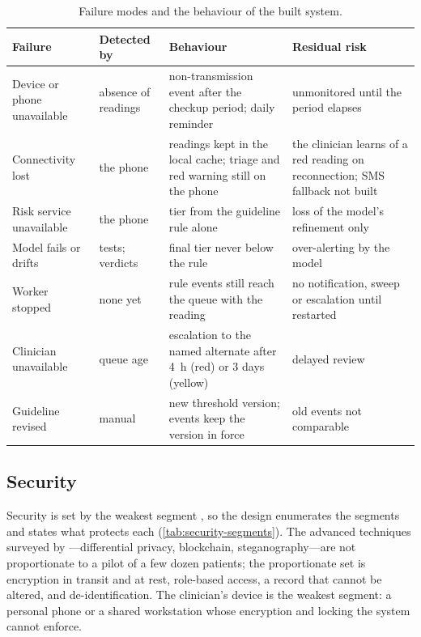 \documentclass[11pt,a4paper,oneside]{report}
\begin{document}
\begin{table}[htbp]
\centering\footnotesize
\caption{Failure modes and the behaviour of the built system.}\label{tab:failure-modes}
\begin{tabularx}{\textwidth}{@{}>{\raggedright\arraybackslash}p{2.8cm} >{\raggedright\arraybackslash}p{2.2cm} X >{\raggedright\arraybackslash}p{3.2cm}@{}}
\toprule
\textbf{Failure} & \textbf{Detected by} & \textbf{Behaviour} & \textbf{Residual risk} \\
\midrule
Device or phone unavailable & absence of readings & non-transmission event after the checkup period; daily reminder & unmonitored until the period elapses \\
Connectivity lost & the phone & readings kept in the local cache; triage and red warning still on the phone & the clinician learns of a red reading on reconnection; SMS fallback not built \\
Risk service unavailable & the phone & tier from the guideline rule alone & loss of the model's refinement only \\
Model fails or drifts & tests; verdicts & final tier never below the rule & over-alerting by the model \\
Worker stopped & none yet & rule events still reach the queue with the reading & no notification, sweep or escalation until restarted \\
Clinician unavailable & queue age & escalation to the named alternate after 4~h (red) or 3 days (yellow) & delayed review \\
Guideline revised & manual & new threshold version; events keep the version in force & old events not comparable \\
\bottomrule
\end{tabularx}
\end{table}

\subsection{Security}\label{sec:security}

Security is set by the weakest segment \parencite{mucchi2021}, so the design enumerates the segments and states what protects each (\cref{tab:security-segments}). The advanced techniques surveyed by \textcite{liu2025review}---differential privacy, blockchain, steganography---are not proportionate to a pilot of a few dozen patients; the proportionate set is encryption in transit and at rest, role-based access, a record that cannot be altered, and de-identification. The clinician's device is the weakest segment: a personal phone or a shared workstation whose encryption and locking the system cannot enforce.
\end{document}
